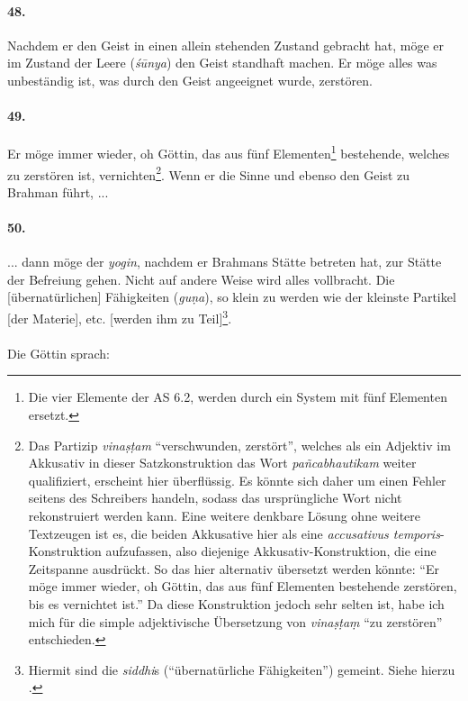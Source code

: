 \documentclass[a4paper,12pt]{article}
\begin{document}
\paragraph{48.} Nachdem er den Geist in einen allein stehenden Zustand gebracht hat, möge er im Zustand der Leere (\textit{śūnya}) den Geist standhaft machen. Er möge alles was unbeständig ist, was durch den Geist angeeignet wurde, zerstören.  

\paragraph{49.} Er möge immer wieder, oh Göttin, das aus fünf Elementen\footnote{Die vier Elemente der AS 6.2, werden durch ein System mit fünf Elementen ersetzt.} bestehende, welches zu zerstören ist, vernichten\footnote{Das Partizip \textit{vinaṣṭam} ``verschwunden, zerstört'', welches als ein Adjektiv im Akkusativ in dieser Satzkonstruktion das Wort \textit{pañcabhautikam} weiter qualifiziert, erscheint hier überflüssig. Es könnte sich daher um einen Fehler seitens des Schreibers handeln, sodass das ursprüngliche Wort nicht rekonstruiert werden kann. Eine weitere denkbare Lösung ohne weitere Textzeugen ist es, die beiden Akkusative hier als eine \textit{accusativus temporis}-Konstruktion aufzufassen, also diejenige Akkusativ-Konstruktion, die eine Zeitspanne ausdrückt. So das hier alternativ übersetzt werden könnte: ``Er möge immer wieder, oh Göttin, das aus fünf Elementen bestehende zerstören, bis es vernichtet ist.'' Da diese Konstruktion jedoch sehr selten ist, habe ich mich für die simple adjektivische Übersetzung von \textit{vinaṣṭaṃ} ``zu zerstören'' entschieden. }. Wenn er die Sinne und ebenso den Geist zu Brahman führt, ...


\paragraph{50.} ... dann möge der \textit{yogin}, nachdem er Brahmans Stätte betreten hat, zur Stätte der Befreiung gehen. Nicht auf andere Weise wird alles vollbracht. Die [übernatürlichen] Fähigkeiten (\textit{guṇa}), so klein zu werden wie der kleinste Partikel [der Materie], etc. [werden ihm zu Teil]\footnote{Hiermit sind die \textit{siddhi}s (``übernatürliche Fähigkeiten'') gemeint. Siehe hierzu \parencite{yogapowers2017}.}. 
\\
\\
\noindent Die Göttin sprach:
\end{document}
